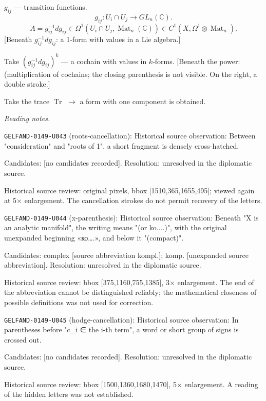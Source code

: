 $g_{ij}$ --- transition functions.
\begin{equation*}
g_{ij}\colon U_i\cap U_j\longrightarrow GL_n(\mathbb C).
\end{equation*}
\begin{equation*}
A=g_{ij}^{-1}dg_{ij}\in
\Omega^1(U_i\cap U_j,\operatorname{Mat}_n(\mathbb C))
\in C^1(X,\Omega^1\otimes\operatorname{Mat}_n).
\end{equation*}
[Beneath $g_{ij}^{-1}dg_{ij}$: a 1-form with values in a Lie algebra.]

Take $(g_{ij}^{-1}dg_{ij})^k$ --- a cochain with values in $k$-forms.
[Beneath the power: (multiplication of cochains; the closing parenthesis is not visible. On the right, a double stroke.]

Take the trace $\operatorname{Tr}$ $\longrightarrow$ a form with one component is obtained.


\par\smallskip\noindent\textit{Reading notes.}\par
\noindent\texttt{GELFAND-0149-U043} (roots-cancellation): Historical source observation: Between "consideration" and "roots of 1", a short fragment is densely cross-hatched.\par
Candidates: [no candidates recorded]. Resolution: unresolved in the diplomatic source.\par
Historical source review: original pixels, bbox [1510,365,1655,495]; viewed again at 5× enlargement. The cancellation strokes do not permit recovery of the letters.\par

\noindent\texttt{GELFAND-0149-U044} (x-parenthesis): Historical source observation: Beneath "X is an analytic manifold", the writing means "(or ko....)", with the original unexpanded beginning «ко….», and below it "(compact)".\par
Candidates: complex [source abbreviation kompl.]; komp. [unexpanded source abbreviation]. Resolution: unresolved in the diplomatic source.\par
Historical source review: bbox [375,1160,755,1385], 3× enlargement. The end of the abbreviation cannot be distinguished reliably; the mathematical closeness of possible definitions was not used for correction.\par

\noindent\texttt{GELFAND-0149-U045} (hodge-cancellation): Historical source observation: In parentheses before "c\_i ∈ the i-th term", a word or short group of signs is crossed out.\par
Candidates: [no candidates recorded]. Resolution: unresolved in the diplomatic source.\par
Historical source review: bbox [1500,1360,1680,1470], 5× enlargement. A reading of the hidden letters was not established.\par


